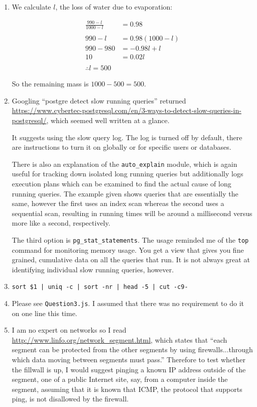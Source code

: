 \documentclass{article}
\begin{document}
\begin{enumerate}[start=0]
\item We calculate $l$, the loss of water due to evaporation:

\begin{align*}
\frac{990-l}{1000-l} & = 0.98 \\
\\
990 - l & = 0.98(1000-l) \\
990 - 980 & = -0.98l + l \\
10 & = 0.02l\\
\\
\therefore l = 500
\end{align*}

So the remaining mass is $1000 - 500 = 500$.

\item Googling ``postgre detect slow running queries'' returned \url{https://www.cybertec-postgresql.com/en/3-ways-to-detect-slow-queries-in-postgresql/}, which seemed well written at a glance. 

It suggests using the slow query log. The log is turned off by default, there are instructions to turn it on globally or for specific users or databases. 

There is also an explanation of the \texttt{auto\_explain} module, which is again useful for tracking down isolated long running queries but additionally logs execution plans which can be examined to find the actual cause of long running queries. The example given shows queries that are essentially the same, however the first uses an index scan whereas the second uses a sequential scan, resulting in running times will be around a millisecond versus more like a second, respectively.

The third option is \texttt{pg\_stat\_statements}. The usage reminded me of the \texttt{top} command for monitoring memory usage. You get a view that gives you fine grained, cumulative data on all the queries that run. It is not always great at identifying individual slow running queries, however.

\item \texttt{sort \$1 | uniq -c | sort -nr | head -5 | cut -c9-}

\item Please see \texttt{Question3.js}. I assumed that there was no requirement to do it on one line this time.

\item I am no expert on networks so I read \url{http://www.linfo.org/network_segment.html}, which states that ``each segment can be protected from the other segments by using firewalls...through which data moving between segments must pass.'' Therefore to test whether the fillwall is up, I would suggest pinging a known IP address outside of the segment, one of a public Internet site, say, from a computer inside the segment, assuming that it is known that ICMP, the protocol that supports ping, is not disallowed by the firewall.


\end{enumerate}
\end{document}
